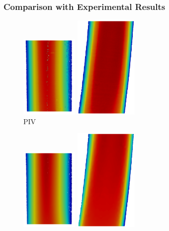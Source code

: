 \subsubsection*{Comparison with Experimental Results}

\begin{figure}\centering
\begin{minipage}[c][10cm][c]{0.25\textwidth}
\centering
\vspace*{\fill}
\includegraphics[height=4cm]{imgs/vena_cava/PIV_coronal_rest.png}
\includegraphics[height=5cm]{imgs/vena_cava/PIV_sagittal_rest.png}
\\PIV
\end{minipage}
\begin{minipage}[c][10cm][c]{0.25\textwidth}
\centering
\vspace*{\fill}
\includegraphics[height=4cm]{imgs/vena_cava/FEM_coronal_rest.png}
\includegraphics[height=5cm]{imgs/vena_cava/FEM_sagittal_rest.png}

\end{minipage}
\end{figure}
